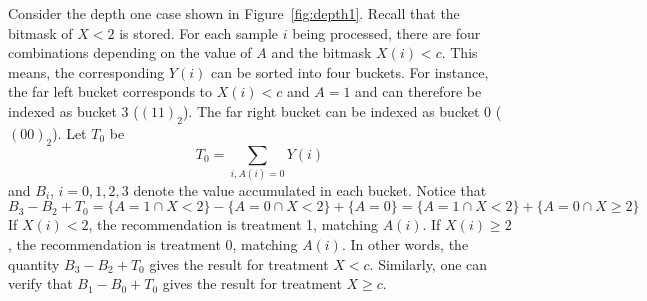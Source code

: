 Consider the depth one case shown in Figure~\ref{fig:depth1}. Recall that the
bitmask of $X < 2$ is stored. For each sample $i$ being processed, there are
four combinations depending on the value of $A$ and the bitmask $X(i) < c$. This
means, the corresponding $Y(i)$ can be sorted into four buckets. For instance,
the far left bucket corresponds to $X(i) < c$ and $A=1$ and can therefore be
indexed as bucket 3 ($(11)_2$). The far right bucket can be indexed as bucket 0 (
$(00)_2$). Let $T_0$ be
\[
T_0 = \sum_{i, A(i) = 0} Y(i)
\]
and $B_i$, $i=0,1,2,3$ denote the value accumulated in each bucket.
Notice that
\[B_3 - B_2 + T_0 
=  \{A = 1 \cap X < 2\} - \{A = 0 \cap X < 2\} + \{A = 0\}
= \{A = 1 \cap X < 2\} + \{A = 0 \cap X \geq 2\}
\]
%
If $X(i) < 2$, the recommendation is treatment 1, matching $A(i)$.
If $X(i)\geq 2$, the recommendation is treatment 0, matching $A(i)$. In other
words, the quantity $B_3 - B_2 + T_0$ gives the result for treatment $X < c$.
Similarly, one can verify that $B_1 - B_0 + T_0$ gives the result for
treatment $X \geq c$. 
